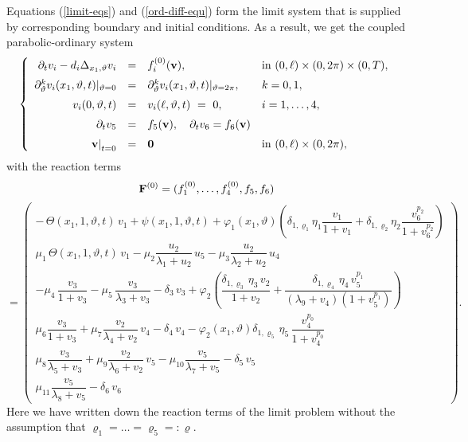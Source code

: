 \documentclass[reqno]{amsart}            %
\numberwithin{equation}{section}
\begin{document}
Equations  (\ref{limit-eqs}) and (\ref{ord-diff-equ}) form the limit system that is supplied by corresponding boundary and initial conditions. As a result, we get the coupled parabolic-ordinary system
 \begin{equation}\label{limit_prob}
\left\{
    \begin{array}{rcll}
    \partial_t {v}_i - d_i \Delta_{x_1,\vartheta}v_i  &=& f_i^{(0)}({\bf v}),
                    & \text{in}\  (0,\ell)\times(0, 2\pi)\times (0,T),
 \\[2mm]
   \partial_{\vartheta}^k v_i(x_1,\vartheta,t)|_{\vartheta=0} &=& \partial_{\vartheta}^k v_i(x_1,\vartheta,t)|_{\vartheta=2\pi},& k =0, 1,
 \\[2mm]
   v_i(0,\vartheta,t) &=& v_i(\ell,\vartheta,t)\ =\ 0, &  i=1,\ldots,4,
                    \\[2mm]
 \partial_t v_5 &=&   f_5({\bf v}), \quad  \partial_t v_6 = f_6({\bf v})
 \\[2mm]
    \left. {\bf v}\right|_{t=0} &=&{\bf 0} &\mbox{in} \  (0,\ell)\times(0, 2\pi),
   \end{array}\right.
\end{equation}
with the reaction terms
$$
{\bf F}^{(0)}= (f_1^{(0)},\ldots,f_4^{(0)}, f_5, f_6)
$$
$$
=
\left(
\begin{array}{l}
 - \, \Theta(x_1,1,\vartheta,t) \, v_1 +  \psi(x_1,1,\vartheta,t) + \varphi_1(x_1,\vartheta) \left(
  \delta_{1, \varrho_1} \eta_1 \dfrac{v_1}{1 + v_1} + \delta_{1, \varrho_2} \eta_2  \dfrac{v_6^{p_2}}{1 + v_6^{p_2}}\right)
\\[3mm]
 \mu_1\, \Theta(x_1,1,\vartheta,t) \, v_1 -  \mu_2 \dfrac{ u_2}{\lambda_1 + u_2} \, u_5 -  \mu_3 \dfrac{ u_2}{\lambda_2 + u_2} \, u_4
\\[3mm]
-  \mu_4 \, \dfrac{ v_3}{1 + v_3}   - \mu_5 \, \dfrac{ v_3}{\lambda_3 + v_3} -  \delta_3 \, v_3
 +  \varphi_2 \left(
\dfrac{\delta_{1, \varrho_3} \, \eta_3 \, v_2}{1 + v_2} +   \dfrac{\delta_{1, \varrho_4} \, \eta_4 \, v_5^{p_1}}{(\lambda_{9} + v_4)(1 + v_5^{p_1})}\right)
\\[3mm]
\mu_6 \dfrac{ v_3}{1 + v_3}  + \mu_7 \dfrac{ v_2}{\lambda_4 + v_2} \, v_4  -  \delta_4 \, v_4
 - \varphi_2(x_1,\vartheta) \delta_{1, \varrho_5}\, \eta_5 \, \dfrac{ v_4^{p_0}}{1 + v_4^{p_0}}
\\[3mm]
\mu_8 \dfrac{v_3}{\lambda_5 + v_3}  +  \mu_9 \dfrac{ v_2}{\lambda_6 + v_2} \, v_5 - \mu_{10} \dfrac{ v_5}{\lambda_7 + v_5}  - \delta_5 \, v_5
\\[3mm]
 \mu_{11} \dfrac{ v_5}{\lambda_8 + v_5}  - \delta_6 \, v_6
\end{array}
\right).
$$
Here we have written down the reaction terms of the limit problem without the assumption that $\varrho_1=\ldots=\varrho_5=:\varrho.$
\end{document}
